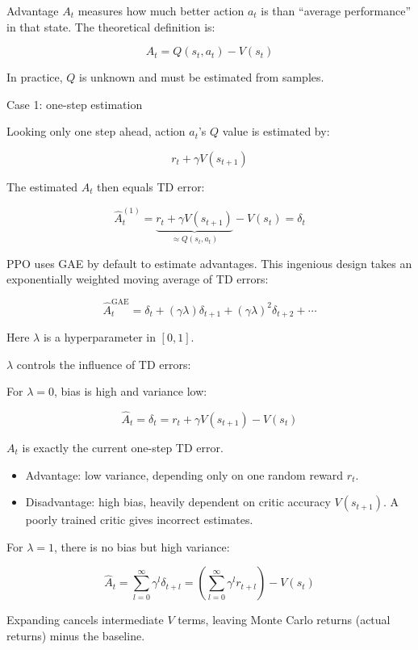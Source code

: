 Advantage \(A_t\) measures how much better action \(a_t\) is than ``average performance'' in that state. The theoretical definition is:

\[
A_t=Q(s_t,a_t)-V(s_t)
\]

In practice, \(Q\) is unknown and must be estimated from samples.

Case 1: one-step estimation

Looking only one step ahead, action \(a_t\)'s \(Q\) value is estimated by:

\[
r_t+\gamma V(s_{t+1})
\]

The estimated \(A_t\) then equals TD error:

\[
\hat{A}_t^{(1)}=\underbrace{r_t+\gamma V(s_{t+1})}_{\approx Q(s_t,a_t)}-V(s_t)=\delta_t
\]

PPO uses GAE by default to estimate advantages. This ingenious design takes an exponentially weighted moving average of TD errors:

\[
\hat{A}_t^{\mathrm{GAE}}
=
\delta_t+(\gamma\lambda)\delta_{t+1}+(\gamma\lambda)^{2}\delta_{t+2}+\cdots
\]

Here \(\lambda\) is a hyperparameter in \([0,1]\).

\(\lambda\) controls the influence of TD errors:

For \(\lambda=0\), bias is high and variance low:

\[
\hat{A}_t=\delta_t=r_t+\gamma V(s_{t+1})-V(s_t)
\]

\(A_t\) is exactly the current one-step TD error.

\begin{itemize}
\tightlist
\item
  Advantage: low variance, depending only on one random reward \(r_t\).
\item
  Disadvantage: high bias, heavily dependent on critic accuracy \(V(s_{t+1})\). A poorly trained critic gives incorrect estimates.
\end{itemize}

For \(\lambda=1\), there is no bias but high variance:

\[
\hat{A}_t=\sum_{l=0}^{\infty}\gamma^{l}\delta_{t+l}=\left(\sum_{l=0}^{\infty}\gamma^{l}r_{t+l}\right)-V(s_t)
\]

Expanding cancels intermediate \(V\) terms, leaving Monte Carlo returns (actual returns) minus the baseline.

